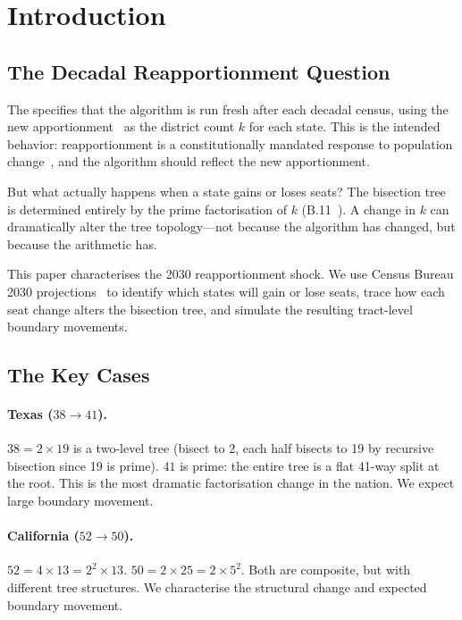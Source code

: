 \section{Introduction}
\label{sec:introduction}

\subsection{The Decadal Reapportionment Question}

The \dia{} specifies that the \ar{} algorithm is run fresh after each
decadal census, using the new \hh{} apportionment~\citep{huntington1928}
as the district count $k$ for each state.
This is the intended behavior: reapportionment is a constitutionally mandated
response to population change~\citep{wesberry1964}, and the algorithm
should reflect the new apportionment.

But what actually happens when a state gains or loses seats?
The \ar{} bisection tree is determined entirely by the prime factorisation
of $k$ (B.11~\citep{b11paper}).
A change in $k$ can dramatically alter the tree topology---not because the
algorithm has changed, but because the arithmetic has.

This paper characterises the 2030 reapportionment shock.
We use Census Bureau 2030 projections~\citep{census2030proj} to identify
which states will gain or lose seats, trace how each seat change alters
the \ar{} bisection tree, and simulate the resulting tract-level boundary
movements.

\subsection{The Key Cases}

\paragraph{Texas ($38 \to 41$).}
$38 = 2 \times 19$ is a two-level tree (bisect to 2, each half bisects
to 19 by recursive bisection since 19 is prime).
$41$ is prime: the entire tree is a flat 41-way split at the root.
This is the most dramatic factorisation change in the nation.
We expect large boundary movement.

\paragraph{California ($52 \to 50$).}
$52 = 4 \times 13 = 2^2 \times 13$.
$50 = 2 \times 25 = 2 \times 5^2$.
Both are composite, but with different tree structures.
We characterise the structural change and expected boundary movement.

